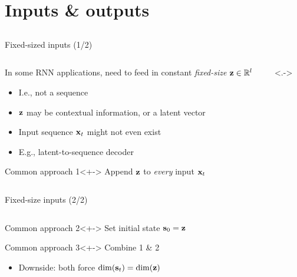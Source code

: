 \section{Inputs \& outputs}
\subsection{}

\begin{frame}{Fixed-sized inputs (1/2)}
    \begin{columns}
        \begin{column}{0.816\textwidth}
            \begin{block}{}
                In some RNN applications, need to feed in constant \emph{fixed-size} $\mathbf{z} \in \mathbb{R}^l$
            \end{block}

            \begin{itemize}
                \item<+-> I.e., not a sequence
                \item $\mathbf{z}$ may be contextual information, or a latent vector
                \item Input sequence $\mathbf{x}_t$ might not even exist
                \item E.g., latent-to-sequence decoder
            \end{itemize}

            \begin{block}{Common approach 1}<+->
                Append \textcolor{Green4}{$\mathbf{z}$} to \emph{every} input $\mathbf{x}_t$
            \end{block}
        \end{column}
        \begin{column}{0.184\textwidth}
            \uncover<.->{}
        \end{column}
    \end{columns}
\end{frame}

\begin{frame}{Fixed-size inputs (2/2)}
    \begin{columns}
        \begin{column}{0.4\textwidth}
            \begin{block}{Common approach 2}<+->
                Set initial state \textcolor{Green4}{$\mathbf{s}_0 = \mathbf{z}$}
            \end{block}
            \begin{block}{Common approach 3}<+->
                Combine 1 \& 2
            \end{block}
            \begin{itemize}
                \item Downside: both force $\dim(\mathbf{s}_t) = \dim(\mathbf{z})$
            \end{itemize}
        \end{column}
        \begin{column}{0.6\textwidth}
            
        \end{column}
    \end{columns}
\end{frame}

